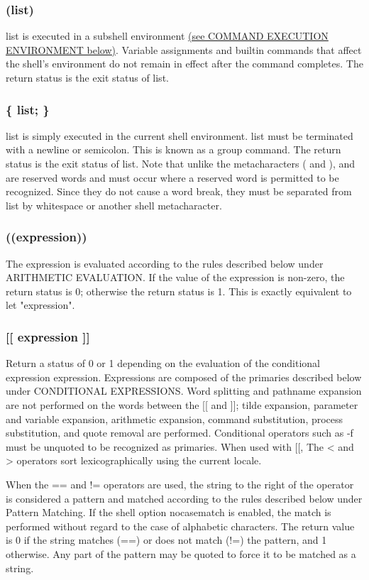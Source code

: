 \documentclass[11pt]{article}
\begin{document}
\subsubsection*{(list)}
list is executed in a subshell environment \hyperref[sec:commandexecutionenvironment]{(see COMMAND EXECUTION ENVIRONMENT below)}. Variable assignments and builtin commands that affect the shell's environment do not remain in effect after the command completes. The return status is the exit status of list.

\subsubsection*{\{ list; \}}
list is simply executed in the current shell environment. list must be terminated with a newline or semicolon. This is known as a group command. The return status is the exit status of list. Note that unlike the metacharacters ( and ), { and } are reserved words and must occur where a reserved word is permitted to be recognized. Since they do not cause a word break, they must be separated from list by whitespace or another shell metacharacter.
\subsubsection*{((expression))}
The expression is evaluated according to the rules described below under ARITHMETIC EVALUATION. If the value of the expression is non-zero, the return status is 0; otherwise the return status is 1. This is exactly equivalent to let "expression".
\subsubsection*{[[ expression ]]}
Return a status of 0 or 1 depending on the evaluation of the conditional expression expression. Expressions are composed of the primaries described below under CONDITIONAL EXPRESSIONS. Word splitting and pathname expansion are not performed on the words between the [[ and ]]; tilde expansion, parameter and variable expansion, arithmetic expansion, command substitution, process substitution, and quote removal are performed. Conditional operators such as -f must be unquoted to be recognized as primaries.
When used with [[, The < and > operators sort lexicographically using the current locale.

When the == and != operators are used, the string to the right of the operator is considered a pattern and matched according to the rules described below under Pattern Matching. If the shell option nocasematch is enabled, the match is performed without regard to the case of alphabetic characters. The return value is 0 if the string matches (==) or does not match (!=) the pattern, and 1 otherwise. Any part of the pattern may be quoted to force it to be matched as a string.
\end{document}
